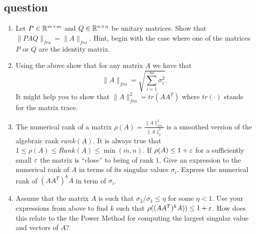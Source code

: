 \documentclass{article}
\begin{document}
\subsection*{question}

\begin{enumerate}
\item Let $P \in {\mathbb{R}}^{m \times m}$ and $Q \in {\mathbb{R}}^{n \times n}$ be unitary matrices.
Show that $\|PAQ\|_{fro} = \|A\|_{fro}$.
Hint, begin with the case where one of the matrices $P$ or $Q$ are the identity matrix.
\item Using the above show that for any matrix $A$ we have that 
\[
\|A\|_{fro} = \sqrt{\sum_{i=1}^{m}\sigma_{i}^{2}}.
\]
It might help you to show that $\|A\|^{2}_{fro} = tr(AA^T)$ where $tr(\cdot)$ stands for the matrix trace.
\item The numerical rank of a matrix $\rho(A) = \frac{\|A\|^{2}_{fro}}{\|A\|^2_2}$ is a smoothed
version of the algebraic rank $rank(A)$. It is always true that $1\le \rho(A) \le Rank(A) \le \min(m,n)$.
If $\rho(A) \le 1 +\varepsilon$ for a sufficiently small $\varepsilon$ the matrix is ``close'' to being of rank $1$.
Give an expression to the numerical rank of $A$ in terms of its
singular values $\sigma_i$. Express the numerical rank of $(AA^T)^{k}A$ in term of  $\sigma_i$.
\item Assume that the matrix $A$ is such that $\sigma_2/\sigma_1 \le \eta$ for some $\eta < 1$.
Use your expressions from above to find $k$ such that $\rho((AA^T)^{k}A)) \le  1+ \varepsilon$.
How does this relate to the the Power Method for computing the largest singular value and vectors of $A$?
\end{enumerate}
\end{document}

